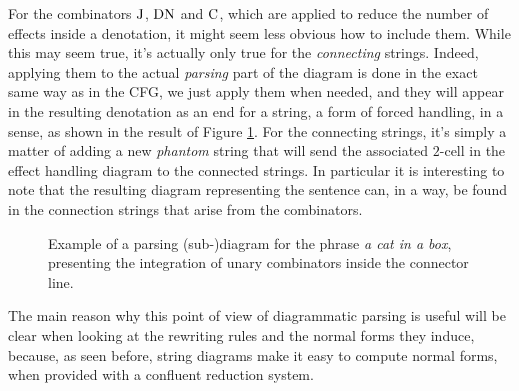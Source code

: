 \medskip

For the combinators $\text{J}$, $\text{DN}$ and $\text{C}$, which are applied to
reduce the number of effects inside a denotation, it might seem less obvious
how to include them.
While this may seem true, it's actually only true for the \emph{connecting}
strings.
Indeed, applying them to the actual \emph{parsing} part of the diagram is done
in the exact same way as in the CFG, we just apply them when needed, and they
will appear in the resulting denotation as an end for a string, a form of
forced handling, in a sense, as shown in the result of Figure
\ref{fig:parsing-diagram2}.
For the connecting strings, it's simply a matter of adding a new \emph{phantom}
string that will send the associated $2$-cell in the effect handling diagram to
the connected strings.
In particular it is interesting to note that the resulting diagram representing
the sentence can, in a way, be found in the connection strings that arise from
the combinators.

\begin{figure}
	\centering
	\caption{Example of a parsing (sub-)diagram for the phrase
		\emph{a cat in a box}, presenting the integration of unary combinators
		inside the connector line.}
	\label{fig:parsing-diagram2}
\end{figure}

The main reason why this point of view of diagrammatic parsing is useful
will be clear when looking at the rewriting rules and the normal forms they
induce, because, as seen before, string diagrams make it easy to compute
normal forms, when provided with a confluent reduction system.

